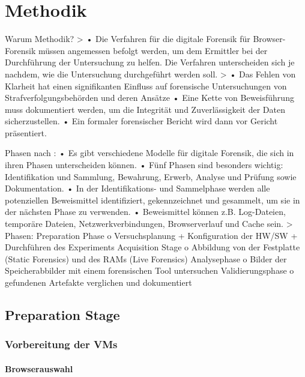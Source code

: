 \chapter{Methodik}

Warum Methodik? 
	> \cite{Izzati.2022}
		•	Die Verfahren für die digitale Forensik für Browser-Forensik müssen angemessen befolgt werden, um dem Ermittler bei der Durchführung der Untersuchung zu helfen. Die Verfahren unterscheiden sich je nachdem, wie die Untersuchung durchgeführt werden soll.
	> \cite{Horsman.2019}
		•	Das Fehlen von Klarheit hat einen signifikanten Einfluss auf forensische Untersuchungen von Strafverfolgungsbehörden und deren Ansätze
		•	Eine Kette von Beweisführung muss dokumentiert werden, um die Integrität und Zuverlässigkeit der Daten sicherzustellen.
		•	Ein formaler forensischer Bericht wird dann vor Gericht präsentiert.
	



Phasen nach \cite{Izzati.2022}:
	•	Es gibt verschiedene Modelle für digitale Forensik, die sich in ihren Phasen unterscheiden können.
	•	Fünf Phasen sind besonders wichtig: Identifikation und Sammlung, Bewahrung, Erwerb, Analyse und Prüfung sowie Dokumentation.
	•	In der Identifikations- und Sammelphase werden alle potenziellen Beweismittel identifiziert, gekennzeichnet und gesammelt, um sie in der nächsten Phase zu verwenden.
	•	Beweismittel können z.B. Log-Dateien, temporäre Dateien, Netzwerkverbindungen, Browserverlauf und Cache sein.
	> Phasen:
		Preparation Phase
		o	Versuchsplanung + Konfiguration der HW/SW + Durchführen des Experiments Acquisition Stage
		o	Abbildung von der Festplatte (Static Forensics) und des RAMs (Live Forensics) Analysephase
		o	Bilder der Speicherabbilder mit einem forensischen Tool untersuchen	Validierungsphase
		o	gefundenen Artefakte verglichen und dokumentiert



\section{Preparation Stage}
\Blindtext[1][3]

\subsection{Vorbereitung der VMs}

\subsubsection*{Browserauswahl}

